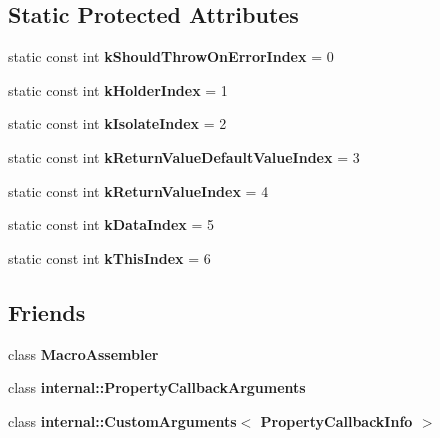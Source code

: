 \subsection*{Static Protected Attributes}
\begin{DoxyCompactItemize}
\item 
\mbox{\label{classv8_1_1PropertyCallbackInfo_aab5f05fed930b0cad97ed7f96520f60e}} 
static const int {\bfseries k\+Should\+Throw\+On\+Error\+Index} = 0
\item 
\mbox{\label{classv8_1_1PropertyCallbackInfo_a8598985473483dfadba4e4c67251675b}} 
static const int {\bfseries k\+Holder\+Index} = 1
\item 
\mbox{\label{classv8_1_1PropertyCallbackInfo_a59ba899cb580bc5e8adca6f799db3e2a}} 
static const int {\bfseries k\+Isolate\+Index} = 2
\item 
\mbox{\label{classv8_1_1PropertyCallbackInfo_a00849f770023891d1466176f5e0c8539}} 
static const int {\bfseries k\+Return\+Value\+Default\+Value\+Index} = 3
\item 
\mbox{\label{classv8_1_1PropertyCallbackInfo_ae16cdf2c6ce787b21d94953cd514ed0e}} 
static const int {\bfseries k\+Return\+Value\+Index} = 4
\item 
\mbox{\label{classv8_1_1PropertyCallbackInfo_a39fc5d6aaccb2916af503c7120ab99c5}} 
static const int {\bfseries k\+Data\+Index} = 5
\item 
\mbox{\label{classv8_1_1PropertyCallbackInfo_a715d28b9c57a581de1698673c9b9eb8a}} 
static const int {\bfseries k\+This\+Index} = 6
\end{DoxyCompactItemize}
\subsection*{Friends}
\begin{DoxyCompactItemize}
\item 
\mbox{\label{classv8_1_1PropertyCallbackInfo_ae605ff1d9d93250ace8a0a8b8d1dee67}} 
class {\bfseries Macro\+Assembler}
\item 
\mbox{\label{classv8_1_1PropertyCallbackInfo_a1ba96a1268a72c23f50314cd99c76f1b}} 
class {\bfseries internal\+::\+Property\+Callback\+Arguments}
\item 
\mbox{\label{classv8_1_1PropertyCallbackInfo_ad1d1e15ddaed2ab44e8f21c5564881ba}} 
class {\bfseries internal\+::\+Custom\+Arguments$<$ Property\+Callback\+Info $>$}
\end{DoxyCompactItemize}


